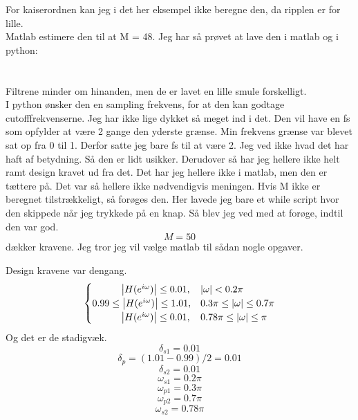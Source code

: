 \begin{Øvelser}
\begin{kapitel}
\begin{Øvelse}
            For kaiserordnen kan jeg i det her eksempel ikke beregne den, da ripplen er for lille. \\
            Matlab estimere den til at M = 48. 
            Jeg har så prøvet at lave den i matlab og i python: 
            \vspace{100pt}\\\\\\
            Filtrene minder om hinanden, men de er lavet en lille smule forskelligt.\\
            I python ønsker den en sampling frekvens, for at den kan godtage cutofffrekvenserne. 
            Jeg har ikke lige dykket så meget ind i det. Den vil have en fs som opfylder at være 2 gange den yderste grænse.
            Min frekvens grænse var blevet sat op fra 0 til 1. Derfor satte jeg bare fs til at være 2. 
            Jeg ved ikke hvad det har haft af betydning. Så den er lidt usikker. 
            Derudover så har jeg hellere ikke helt ramt design kravet ud fra det. 
            Det har jeg hellere ikke i matlab, men den er tættere på. 
            Det var så hellere ikke nødvendigvis meningen. Hvis M ikke er beregnet tilstrækkeligt, så forøges den. 
            Her lavede jeg bare et while script hvor den skippede når jeg trykkede på en knap. Så blev jeg ved med at forøge, indtil den var god.
            \[M = 50\] dækker kravene. 
            Jeg tror jeg vil vælge matlab til sådan nogle opgaver.            
        \end{Øvelse}  
        \begin{Øvelse}
            Design kravene var dengang. 
            \[ 
            \begin{cases}
            \tab{2}\left| H(e^{i\omega}) \right| \leq 0.01, & |\omega| < 0.2\pi \\
            0.99 \leq \left| H(e^{i\omega}) \right| \leq 1.01, & 0.3\pi \leq |\omega| \leq 0.7\pi \\
            \tab{2}\left| H(e^{i\omega}) \right| \leq 0.01, & 0.78\pi \leq |\omega| \leq \pi
            \end{cases}
            \]
            Og det er de stadigvæk. 
            \[\delta_{s1} = 0.01\]
            \[\delta_{p} = (1.01 - 0.99)/2 = 0.01\]
            \[\delta_{s2} = 0.01\]
            \[\omega_{s1} = 0.2\pi\]
            \[\omega_{p1} = 0.3\pi\]
            \[\omega_{p2} = 0.7\pi\]
            \[\omega_{s2} = 0.78\pi\]


\end{Øvelse}
\end{kapitel}
\end{Øvelser}
